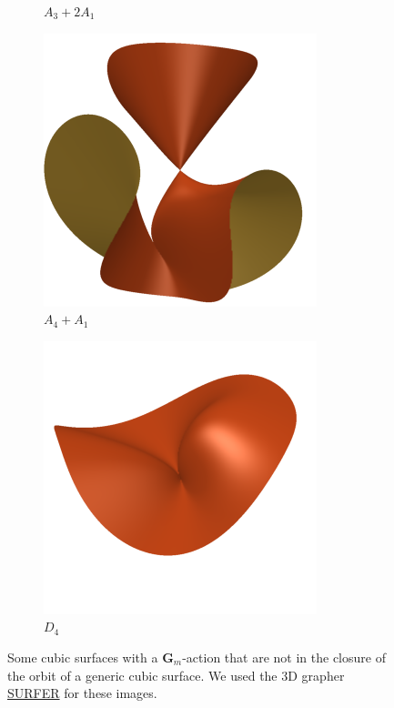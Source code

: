 \documentclass[11pt,reqno, letterpaper]{amsart}
\numberwithin{equation}{section}
\newcommand{\G}{\mathbf G}
\begin{document}
\begin{figure}
\begin{subfigure}{.24\textwidth}
    \caption{$A_3+2A_1$}
  \end{subfigure}
  \begin{subfigure}{.24\textwidth}
    \centering
    \includegraphics[width=\textwidth]{cubicA4_A1}
    \caption{$A_4+A_1$}
  \end{subfigure}
  \begin{subfigure}{.24\textwidth}
    \centering
    \includegraphics[width=\textwidth]{cubicD4}
    \caption{$D_4$}
  \end{subfigure}
  \caption{Some cubic surfaces with a $\G_m$-action that are not in
    the closure of the orbit of a generic cubic surface. We used the
    3D grapher
    \href{https://singsurf.org/parade/Cubics.php}{SURFER} for these
    images.}
  \label{fig:surfaces}
\end{figure}
\end{document}
